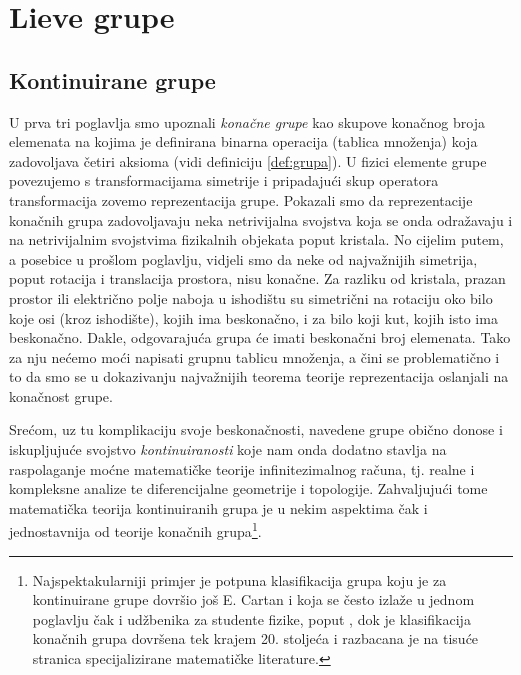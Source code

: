 
\chapter{Lieve grupe}
\label{ch:lie}

\section{Kontinuirane grupe}


U prva tri poglavlja smo upoznali \emph{konačne grupe} kao skupove
konačnog broja elemenata na kojima je definirana binarna operacija (tablica množenja)
koja zadovoljava četiri aksioma (vidi definiciju \ref{def:grupa}). 
U fizici elemente grupe povezujemo
s transformacijama simetrije i pripadajući skup operatora transformacija
zovemo reprezentacija grupe. Pokazali smo da reprezentacije konačnih grupa
zadovoljavaju neka netrivijalna svojstva koja se onda odražavaju
i na netrivijalnim svojstvima fizikalnih objekata poput kristala.
No cijelim putem, a posebice u prošlom poglavlju, vidjeli smo da neke
od najvažnijih simetrija, poput rotacija i translacija prostora,
nisu konačne. Za razliku od kristala, prazan prostor ili električno
polje naboja u ishodištu su simetrični na rotaciju oko bilo koje
osi (kroz ishodište), kojih ima beskonačno, i za bilo koji kut, kojih
isto ima beskonačno. Dakle, odgovarajuća grupa će imati beskonačni
broj elemenata. Tako za nju nećemo moći napisati grupnu tablicu
množenja, a čini se problematično i to da smo se u dokazivanju
najvažnijih teorema teorije reprezentacija oslanjali na konačnost
grupe.

Srećom, uz tu komplikaciju svoje beskonačnosti, navedene grupe obično donose
i iskupljujuće svojstvo \emph{kontinuiranosti} koje nam onda dodatno
stavlja na raspolaganje moćne matematičke teorije infinitezimalnog računa,
tj. realne i kompleksne analize te diferencijalne geometrije i topologije.
Zahvaljujući tome matematička teorija kontinuiranih grupa je u nekim aspektima
čak i jednostavnija od teorije konačnih grupa\footnote{Najspektakularniji
    primjer je potpuna klasifikacija grupa koju je za kontinuirane
    grupe dovršio još E. Cartan i koja se često izlaže u jednom poglavlju
    čak i udžbenika za studente fizike, poput \cite{Jones:1998}, dok je
    klasifikacija konačnih grupa dovršena tek krajem 20. stoljeća i razbacana
je na tisuće stranica specijalizirane matematičke literature.}.


